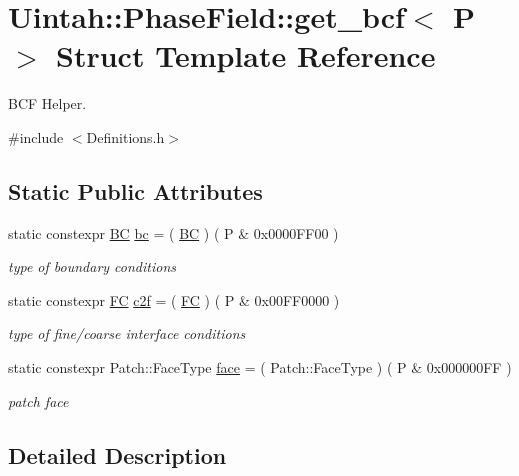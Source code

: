 \hypertarget{structUintah_1_1PhaseField_1_1get__bcf}{}\section{Uintah\+:\+:Phase\+Field\+:\+:get\+\_\+bcf$<$ P $>$ Struct Template Reference}
\label{structUintah_1_1PhaseField_1_1get__bcf}


B\+CF Helper.  




{\ttfamily \#include $<$Definitions.\+h$>$}

\subsection*{Static Public Attributes}
\begin{DoxyCompactItemize}
\item 
static constexpr \hyperlink{namespaceUintah_1_1PhaseField_a148fba372aa3be96fd6eede7a2fa10b5}{BC} \hyperlink{structUintah_1_1PhaseField_1_1get__bcf_ab31404d547e11f080ff3a88cf1a8d58d}{bc} = ( \hyperlink{namespaceUintah_1_1PhaseField_a148fba372aa3be96fd6eede7a2fa10b5}{BC} ) ( P \& 0x0000\+F\+F00 )
\begin{DoxyCompactList}\small\item\em type of boundary conditions \end{DoxyCompactList}\item 
static constexpr \hyperlink{namespaceUintah_1_1PhaseField_aeb51fe956fe07f1487f5878f4039f27c}{FC} \hyperlink{structUintah_1_1PhaseField_1_1get__bcf_a1e4dad009db8a43648ddfb7bec0accb9}{c2f} = ( \hyperlink{namespaceUintah_1_1PhaseField_aeb51fe956fe07f1487f5878f4039f27c}{FC} ) ( P \& 0x00\+F\+F0000 )
\begin{DoxyCompactList}\small\item\em type of fine/coarse interface conditions \end{DoxyCompactList}\item 
static constexpr Patch\+::\+Face\+Type \hyperlink{structUintah_1_1PhaseField_1_1get__bcf_a6d5a9f0b2a5c5f39dcdf3e8d7b61feba}{face} = ( Patch\+::\+Face\+Type ) ( P \& 0x000000\+F\+F )
\begin{DoxyCompactList}\small\item\em patch face \end{DoxyCompactList}\end{DoxyCompactItemize}


\subsection{Detailed Description}
